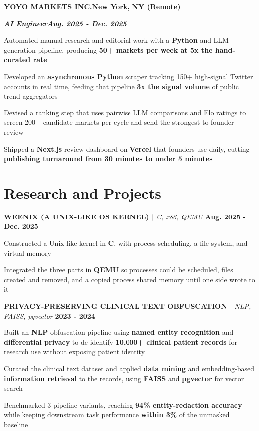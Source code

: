 \documentclass[10pt]{article}
\newcommand{\job}[4]{%
  \vspace{0pt}%
  \textbf{\MakeUppercase{#1}}\hfill\textbf{#2}\par
  \vspace{0.5pt}%
  \textbf{\textit{#3}}\hfill\textbf{\textit{#4}}\par
}
\newcommand{\proj}[4]{%
  \vspace{3pt}%
  \textbf{\MakeUppercase{#1} | }\textit{#2}\hfill
  \textbf{#4}%
  \notblank{#3}{\ \textbf{| #3}}{}%
  \par
}
\begin{document}
\vspace{3pt}
\job{Yoyo Markets Inc.}{New York, NY (Remote)}{AI Engineer}{Aug. 2025 - Dec. 2025}
\begin{bullets}
  \item Automated manual research and editorial work with a \textbf{Python} and LLM generation pipeline, producing \textbf{50+ markets per week at 5x the hand-curated rate}
  \item Developed an \textbf{asynchronous Python} scraper tracking 150+ high-signal Twitter accounts in real time, feeding that pipeline \textbf{3x the signal volume} of public trend aggregators
  \item Devised a ranking step that uses pairwise LLM comparisons and Elo ratings to screen 200+ candidate markets per cycle and send the strongest to founder review
  \item Shipped a \textbf{Next.js} review dashboard on \textbf{Vercel} that founders use daily, cutting \textbf{publishing turnaround from 30 minutes to under 5 minutes}
\end{bullets}

\section{Research and Projects}
\vspace{-3pt}
\proj{Weenix (A Unix-Like OS Kernel)}{C, x86, QEMU}{USC}{Aug. 2025 - Dec. 2025}
\begin{bullets}
  \item Constructed a Unix-like kernel in \textbf{C}, with process scheduling, a file system, and virtual memory
  \item Integrated the three parts in \textbf{QEMU} so processes could be scheduled, files created and removed, and a copied process shared memory until one side wrote to it
\end{bullets}

\proj{Privacy-Preserving Clinical Text Obfuscation}{NLP, FAISS, pgvector}{UMich SOCR Lab}{2023 - 2024}
\begin{bullets}
  \item Built an \textbf{NLP} obfuscation pipeline using \textbf{named entity recognition} and \textbf{differential privacy} to de-identify \textbf{10,000+ clinical patient records} for research use without exposing patient identity
  \item Curated the clinical text dataset and applied \textbf{data mining} and embedding-based \textbf{information retrieval} to the records, using \textbf{FAISS} and \textbf{pgvector} for vector search
  \item Benchmarked 3 pipeline variants, reaching \textbf{94\% entity-redaction accuracy} while keeping downstream task performance \textbf{within 3\%} of the unmasked baseline
\end{bullets}
\end{document}
